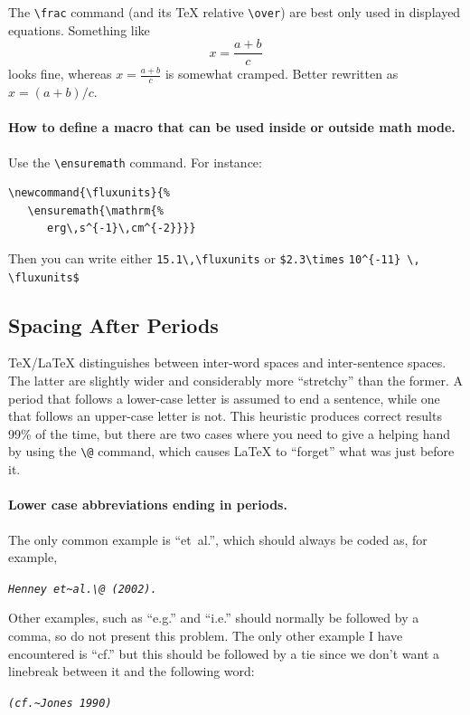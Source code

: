 \documentclass[debug]{rmxaa}
\newcommand{\CS}[1]{\texttt{\textbackslash #1}}
\newenvironment{Example}
{\begin{list}{}{\setlength{\leftmargin}{10pt}\setlength{\rightmargin}{10pt}}%
  \item[]\itshape}
  {\end{list}}
\begin{document}
The \CS{frac} command (and its \TeX{} relative \CS{over}) are best
only used in displayed equations. Something like 
\begin{equation}
  \label{eq:one}
  x = \frac { a + b } { c } 
\end{equation}
looks fine, whereas $x = \frac { a + b } { c }$ is somewhat cramped.
Better rewritten as $x = (a + b) / c $. 

\paragraph{How to define a macro that can be used inside or outside
  math mode.} Use the \CS{ensuremath} command. For instance: 
\begin{verbatim}
\newcommand{\fluxunits}{%
   \ensuremath{\mathrm{%
      erg\,s^{-1}\,cm^{-2}}}}
\end{verbatim}
Then you can write either \verb+15.1\,\fluxunits+ or
\verb+$2.3\times+ \verb+10^{-11} \,+ \verb+\fluxunits$+


\subsection{Spacing After Periods}
\label{sec:space}

\TeX{}/\LaTeX{} distinguishes between inter-word spaces and
inter-sentence spaces. The latter are slightly wider and considerably
more ``stretchy'' than the former. A period that follows a lower-case
letter is assumed to end a sentence, while one that follows an
upper-case letter is not.  This heuristic produces correct results
99\% of the time, but there are two cases where you need to give a
helping hand by using the \verb+\@+ command, which causes \LaTeX{} to
``forget'' what was just before it. 


\paragraph{Lower case abbreviations ending in periods.} The only common
example is ``et~al.\@'', which should always be coded as, for example,
\begin{Example}
  \verb+Henney et~al.\@ (2002).+
\end{Example} 
Other examples, such as ``e.g.\@'' and ``i.e.\@'' should normally be
followed by a comma, so do not present this problem. The only other
example I have encountered is ``cf.\@'' but this should be followed by
a tie since we don't want a linebreak between it and the following
word:
\begin{Example}
  \verb+(cf.~Jones 1990)+
\end{Example}
\end{document}
